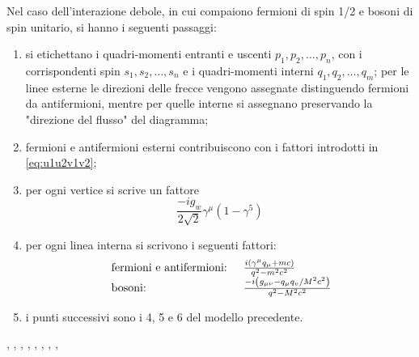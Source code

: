 \documentclass{subnucbo}
\begin{document}
Nel caso dell'interazione debole, in cui compaiono fermioni di spin 1/2 e bosoni di spin unitario, si hanno i seguenti passaggi:
\begin{enumerate}
        \item si etichettano i quadri-momenti entranti e uscenti $p_{1}, p_{2}, \ldots, p_{n}$, con i corrispondenti spin $s_{1}, s_{2}, \ldots, s_{n}$ e i quadri-momenti interni $q_{1}, q_{2}, \ldots, q_{m}$; per le linee esterne le direzioni delle frecce vengono assegnate distinguendo fermioni da antifermioni, mentre per quelle interne si assegnano preservando la "direzione del flusso" del diagramma;
        \item fermioni e antifermioni esterni contribuiscono con i fattori introdotti in \ref{eq:u1u2v1v2};
        \item per ogni vertice si scrive un fattore
                \begin{equation}
                        \frac { - i g _ { w } } { 2 \sqrt { 2 } } \gamma ^ { \mu } \left( 1 - \gamma ^ { 5 } \right)
                \end{equation}
        \item per ogni linea interna si scrivono i seguenti fattori:
                \begin{equation}
                        \begin{array} { l l } { \text { fermioni e antifermioni: } } & { \frac { i \left( \gamma ^ { \mu } q _ { \mu } + m c \right) } { q ^ { 2 } - m ^ { 2 } c ^ { 2 } } } \\ { \text { bosoni: } } & { \frac{- i \left( g _ { \mu \nu } - q _ { \mu } q _ { v } / M ^ { 2 } c ^ { 2 } \right)}{ q ^ { 2 } - M ^ { 2 } c ^ { 2 }  }   }\\ \end{array}
                \end{equation}
        \item i punti successivi sono i 4, 5 e 6 del modello precedente.
\end{enumerate}


\begin{thebibliography}{0}
                ,
                ,
                ,
                ,
                ,
                ,
                ,
                ,
\end{thebibliography}
\end{document}

